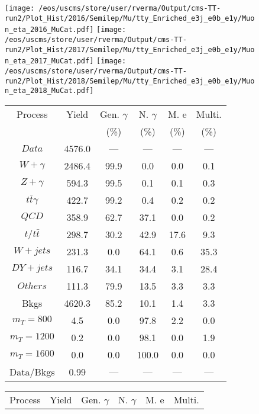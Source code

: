 \begin{figure}
\centering
\texttt{[image: /eos/uscms/store/user/rverma/Output/cms-TT-run2/Plot\_Hist/2016/Semilep/Mu/tty\_Enriched\_e3j\_e0b\_e1y/Muon\_eta\_2016\_MuCat.pdf]}
\texttt{[image: /eos/uscms/store/user/rverma/Output/cms-TT-run2/Plot\_Hist/2017/Semilep/Mu/tty\_Enriched\_e3j\_e0b\_e1y/Muon\_eta\_2017\_MuCat.pdf]}
\texttt{[image: /eos/uscms/store/user/rverma/Output/cms-TT-run2/Plot\_Hist/2018/Semilep/Mu/tty\_Enriched\_e3j\_e0b\_e1y/Muon\_eta\_2018\_MuCat.pdf]}
\begin{minipage}[c]{0.32\textwidth}
\centering
\tiny{
\begin{tabular}{cccccc}
\hline
Process & Yield & Gen. $\gamma$ & N. $\gamma$ & M. e & Multi. \\
 &  & (\%) & (\%) & (\%) & (\%)  \\
\hline
                                                                      $ Data $ &  4576.0 &  --- &  --- &  --- &  ---\\
$ W+\gamma $ &  2486.4 &  99.9 &  0.0 &  0.0 &  0.1\\
$ Z+\gamma $ &  594.3 &  99.5 &  0.1 &  0.1 &  0.3\\
$ t\bar{t}\gamma $ &  422.7 &  99.2 &  0.4 &  0.2 &  0.2\\
$ QCD $ &  358.9 &  62.7 &  37.1 &  0.0 &  0.2\\
$ t/t\bar{t} $ &  298.7 &  30.2 &  42.9 &  17.6 &  9.3\\
$ W+jets $ &  231.3 &  0.0 &  64.1 &  0.6 &  35.3\\
$ DY+jets $ &  116.7 &  34.1 &  34.4 &  3.1 &  28.4\\
$ Others $ &  111.3 &  79.9 &  13.5 &  3.3 &  3.3\\
Bkgs &  4620.3 &  85.2 &  10.1 &  1.4 &  3.3\\
$ m_{T} = 800 $ &  4.5 &  0.0 &  97.8 &  2.2 &  0.0\\
$ m_{T} = 1200 $ &  0.2 &  0.0 &  98.1 &  0.0 &  1.9\\
$ m_{T} = 1600 $ &  0.0 &  0.0 &  100.0 &  0.0 &  0.0\\
Data/Bkgs &  0.99 &  --- &  --- &  --- &  ---\\
\hline
\end{tabular}
}
\end{minipage}
\begin{minipage}[c]{0.32\textwidth}
\centering
\tiny{
\begin{tabular}{cccccc}
\hline
Process & Yield & Gen. $\gamma$ & N. $\gamma$ & M. e & Multi. \\

\end{tabular}}
\end{minipage}
\end{figure}
